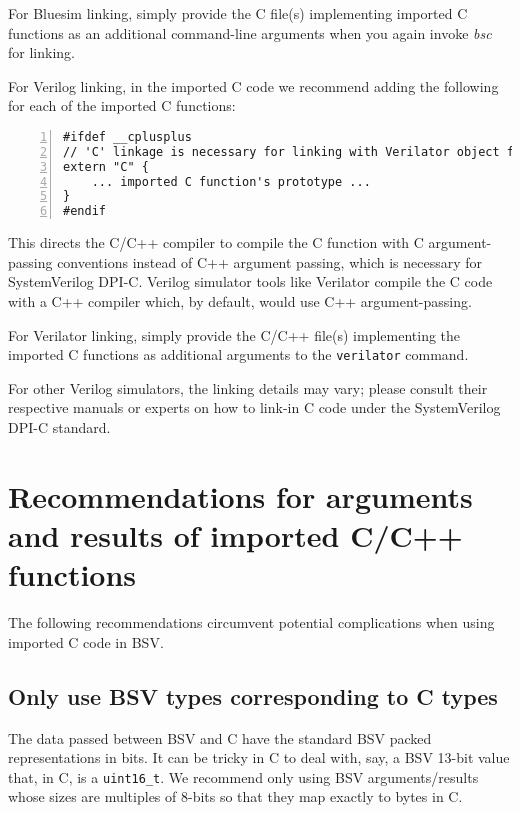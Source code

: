 For Bluesim linking, simply provide the C file(s) implementing
imported C functions as an additional command-line arguments when you
again invoke \emph{bsc} for linking.

For Verilog linking, in the imported C code we recommend adding the
following for each of the imported C functions:

{\footnotesize
\begin{Verbatim}[frame=single, numbers=left]
#ifdef __cplusplus
// 'C' linkage is necessary for linking with Verilator object files
extern "C" {
    ... imported C function's prototype ...
}
#endif
\end{Verbatim}
}

This directs the C/C++ compiler to compile the C function with C
argument-passing conventions instead of C++ argument passing, which is
necessary for SystemVerilog DPI-C.  Verilog simulator tools like
Verilator compile the C code with a C++ compiler which, by default,
would use C++ argument-passing.

For Verilator linking, simply provide the C/C++ file(s) implementing
the imported C functions as additional arguments to the
\verb|verilator| command.

For other Verilog simulators, the linking details may vary; please
consult their respective manuals or experts on how to link-in C code
under the SystemVerilog DPI-C standard.


\section{Recommendations for arguments and results of imported C/C++ functions}

The following recommendations circumvent potential complications when
using imported C code in BSV.


\subsection{Only use BSV types corresponding to C types}

The data passed between BSV and C have the standard BSV packed
representations in bits.  It can be tricky in C to deal with, say, a
BSV 13-bit value that, in C, is a \verb|uint16_t|.  We recommend only
using BSV arguments/results whose sizes are multiples of 8-bits so
that they map exactly to bytes in C.

